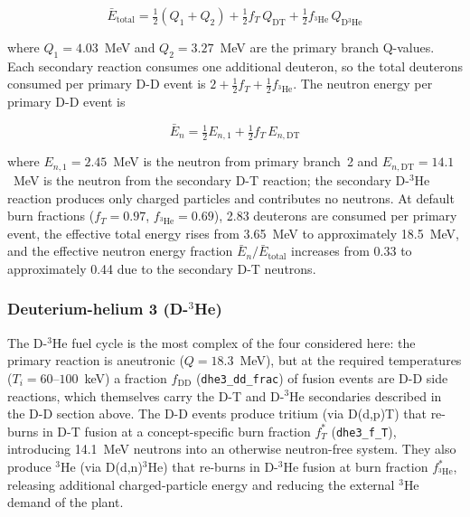 \documentclass{article}
\begin{document}
\begin{equation}
\label{eq:dd-etotal}
\bar{E}_{\text{total}} = \tfrac{1}{2}(Q_1 + Q_2)
  + \tfrac{1}{2} f_T \, Q_{\text{DT}}
  + \tfrac{1}{2} f_{{}^3\text{He}} \, Q_{\text{D}{}^3\text{He}}
\end{equation}

\noindent where $Q_1 = 4.03$~MeV and $Q_2 = 3.27$~MeV are the primary
branch Q-values. Each secondary reaction consumes one additional
deuteron, so the total deuterons consumed per primary D-D event is
$2 + \tfrac{1}{2} f_T + \tfrac{1}{2} f_{{}^3\text{He}}$.
The neutron energy per primary D-D event is

\begin{equation}
\label{eq:dd-eneutron}
\bar{E}_n = \tfrac{1}{2} E_{n,1} + \tfrac{1}{2} f_T \, E_{n,\text{DT}}
\end{equation}

\noindent where $E_{n,1} = 2.45$~MeV is the neutron from primary branch~2
and $E_{n,\text{DT}} = 14.1$~MeV is the neutron from the secondary D-T
reaction; the secondary D-${}^3$He reaction produces only charged
particles and contributes no neutrons.
At default burn fractions ($f_T = 0.97$,
$f_{{}^3\text{He}} = 0.69$), 2.83 deuterons are consumed per primary
event, the effective total energy rises from
3.65~MeV to approximately 18.5~MeV, and the effective
neutron energy fraction $\bar{E}_n / \bar{E}_{\text{total}}$ increases from
0.33 to approximately 0.44 due to the secondary D-T neutrons.

\subsubsection{\texorpdfstring{Deuterium-helium 3 (D-${}^3$He)}{Deuterium-helium 3 (D-3He)}}
\label{sec:dhe3-split}
The D-${}^3$He fuel cycle is the most complex of the four considered
here: the primary reaction is aneutronic ($Q = 18.3$~MeV), but at the
required temperatures ($T_i = 60$--$100$~keV) a fraction
$f_{\text{DD}}$ (\texttt{dhe3\_dd\_frac}) of fusion events are D-D
side reactions, which themselves carry the D-T and D-${}^3$He
secondaries described in the D-D section above. The D-D events
produce tritium (via D(d,p)T) that re-burns in D-T fusion at a
concept-specific burn fraction $f_T^*$ (\texttt{dhe3\_f\_T}),
introducing 14.1~MeV neutrons into an otherwise neutron-free system. They also produce
${}^3$He (via D(d,n)${}^3$He) that re-burns in D-${}^3$He fusion at
burn fraction $f_{{}^3\text{He}}^*$, releasing additional
charged-particle energy and reducing the external ${}^3$He demand
of the plant.
\end{document}
